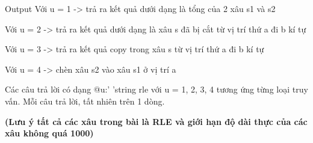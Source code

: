 Output
Với u = 1 -> trả ra kết quả dưới dạng là tổng của 2 xâu s1 và s2

Với u = 2 -> trả ra kết quả dưới dạng là xâu s đã bị cắt từ vị trí thứ a đi b kí tự

Với u = 3 -> trả ra kết quả copy trong xâu s từ vị trí thứ a đi b kí tự

Với u = 4 -> chèn xâu s2 vào xâu s1 ở vị trí a

Các câu trả lời có dạng @u:' 'string rle với u = 1, 2, 3, 4 tương ứng từng loại truy vấn. Mỗi câu trả lời, tất nhiên trên 1 dòng.

\textbf{(Lưu ý tất cả các xâu trong bài là RLE và giới hạn độ dài thực của các xâu không quá 1000) }\textbf{}